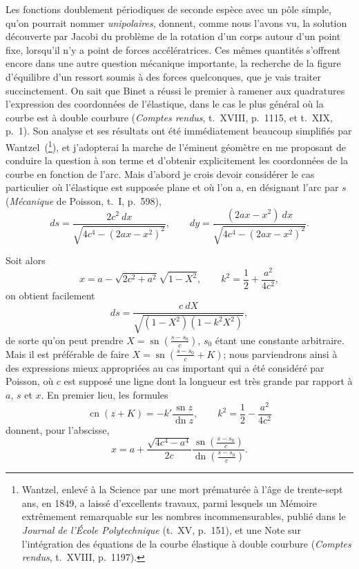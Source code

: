 \documentclass[11pt,leqno,oneside,letterpaper]{book}[2005/09/16]
\DeclareMathOperator{\sn}{sn}
\DeclareMathOperator{\cn}{cn}
\DeclareMathOperator{\dn}{dn}
\begin{document}
Les fonctions doublement p\'eriodiques de seconde esp\`ece avec un
p\^ole simple, qu'on pourrait nommer \textit{unipolaires}, donnent, comme nous
l'avons vu, la solution d\'ecouverte par Jacobi du probl\`eme de la rotation
d'un corps autour d'un point fixe, lorsqu'il n'y a point de forces acc\'el\'eratrices.
Ces m\^emes quantit\'es s'offrent encore dans une autre question
m\'ecanique importante, la recherche de la figure d'\'equilibre d'un ressort
soumis \`a des forces quelconques, que je vais traiter succinctement. On sait
que Binet a r\'eussi le premier \`a ramener aux quadratures l'expression des
coordonn\'ees de l'\'elastique, dans le cas le plus g\'en\'eral o\`u la courbe est \`a
double courbure (\textit{Comptes rendus}, t.~XVIII, p.~1115, et t.~XIX, p.~1). Son
analyse et ses r\'esultats ont \'et\'e imm\'ediatement beaucoup simplifi\'es par
Wantzel~(\footnote{
Wantzel, enlev\'e \`a la Science par une mort pr\'ematur\'ee \`a l'\^age de trente-sept ans,
en 1849, a laiss\'e d'excellents travaux, parmi lesquels un M\'emoire extr\^emement remarquable
sur les nombres incommensurables, publi\'e dans le \textit{Journal de l'\'Ecole Polytechnique}
(t.~XV, p.~151), et une Note sur l'int\'egration des \'equations de la courbe \'elastique
\`a double courbure (\textit{Comptes rendus}, t.~XVIII, p.~1197).
}), et j'adopterai la marche de l'\'eminent g\'eom\`etre en me proposant
de conduire la question \`a son terme et d'obtenir explicitement les
coordonn\'ees de la courbe en fonction de l'arc. Mais d'abord je crois devoir
consid\'erer le cas particulier o\`u l'\'elastique est suppos\'ee plane et o\`u l'on a,
en d\'esignant l'arc par $s$ (\textit{M\'ecanique} de Poisson, t.~I, p.~598),
\[
ds = \frac{2c^2 \: dx}{\sqrt{4c^4 - (2ax - x^2)^2}}, \qquad
dy = \frac{(2ax - x^2)\: dx}{\sqrt{4c^4 - (2ax - x^2)^2}}.
\]

Soit alors
\[
x   = a - \sqrt{2c^2 + a^2}\sqrt{1 - X^2}, \qquad
k^2 = \frac{1}{2} + \frac{a^2}{4c^2},
\]
on obtient facilement
\[
ds = \frac{ c \: dX }{ \sqrt{ (1 - X^2)(1 - k^2 X^2) } },
\]
de sorte qu'on peut prendre $X = \sn \left( \frac{s-s_0}{c} \right)$, $s_0$ \'etant une constante arbitraire.
Mais il est pr\'ef\'erable de faire $X = \sn \left(\frac{s-s_0}{c} + K \right)$; nous parviendrons
ainsi \`a des expressions mieux appropri\'ees au cas important qui a \'et\'e
consid\'er\'e par Poisson, o\`u $c$ est suppos\'e une ligne dont la longueur est
tr\`es grande par rapport \`a $a$, $s$ et $x$. En premier lieu, les formules
\[
\cn(z+K) = -k' \frac{\sn z}{\dn z}, \qquad
k^2 = \frac{1}{2} - \frac{a^2}{4c^2}
\]
donnent, pour l'abscisse,
\[
x = a + \frac{ \sqrt{4c^4-a^4} }{2c}
  \frac{ \sn \left( \frac{s-s_0}{c} \right) }{ \dn \left( \frac{s-s_0}{c} \right) } .
\]
\end{document}
